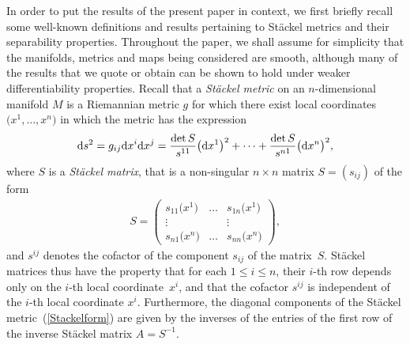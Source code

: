 In order to put the results of the present paper in context, we first briefly recall some well-known definitions and results pertaining to St\"ackel metrics and their separability properties. Throughout the paper, we shall assume for simplicity that the manifolds, metrics and maps being considered are smooth, although many of the results that we quote or obtain can be shown to hold under weaker differentiability properties. Recall \cite{BCR1-2002, Eis1934, KaMi1980, Sta1897} that a {\emph {St\"ackel metric}} on an $n$-dimensional manifold $M$ is a Riemannian metric $g$ for which there exist local coordinates $\big(x^{1},\dots,x^{n}\big)$ in which the metric has the expression
\begin{gather}\label{Stackelform}
{\rm d}s^{2}=g_{ij}{\rm d}x^{i}{\rm d}x^{j}=\frac{\det S}{s^{11}}\big({\rm d}x^{1}\big)^{2}+\cdots+\frac{\det S}{s^{n1}}\big({\rm d}x^{n}\big)^{2},
\end{gather}
where $S$ is a {\emph{St\"ackel matrix}}, that is a non-singular $n\times n$ matrix $S=(s_{ij})$ of the form
\begin{gather}\label{StackelMatrix}
S=\left(
\begin{matrix}
s_{11}\big(x^{1}\big)&\dots&s_{1n}\big(x^{1}\big) \\
\vdots& & \vdots \\
s_{n1}\big(x^{n}\big)&\dots&s_{nn}\big(x^{n}\big)
\end{matrix}
\right),
\end{gather}
and $s^{ij}$ denotes the cofactor of the component $s_{ij}$ of the matrix~$S$. St\"ackel matrices thus have the property that for each $1\leq i \leq n$, their $i$-th row depends only on the $i$-th local coordinate~$x^{i}$, and that the cofactor $s^{ij}$ is independent of the $i$-th local coordinate $x^{i}$. Furthermore, the diagonal components of the St\"ackel metric~(\ref{Stackelform}) are given by the inverses of the entries of the first row of the inverse St\"ackel matrix $A=S^{-1}$.

